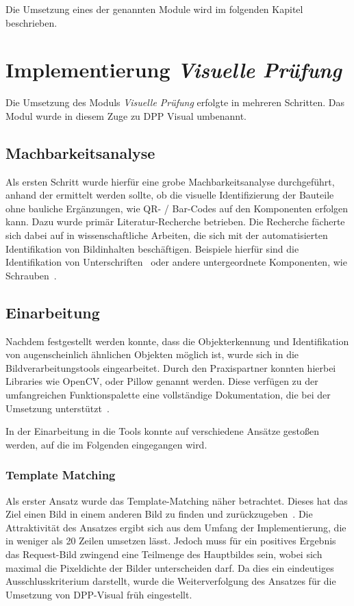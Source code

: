 \documentclass[
    type=Prakikumsbericht,
    status=draft, %
    language=german, %
    bibengine=bibtex,
]{unibwm-inf-thesis}
\begin{document}
    Die Umsetzung eines der genannten Module wird im folgenden Kapitel beschrieben.


    \chapter{Implementierung \textit{Visuelle Prüfung}}
    Die Umsetzung des Moduls \textit{Visuelle Prüfung} erfolgte in mehreren Schritten.
    Das Modul wurde in diesem Zuge zu \ac{DPP} Visual umbenannt.

    \section{Machbarkeitsanalyse}
    Als ersten Schritt wurde hierfür eine grobe Machbarkeitsanalyse durchgeführt, anhand der ermittelt werden sollte,
    ob die visuelle Identifizierung der Bauteile ohne bauliche Ergänzungen, wie QR- / Bar-Codes auf den Komponenten erfolgen kann.
    Dazu wurde primär Literatur-Recherche betrieben.
    Die Recherche fächerte sich dabei auf in wissenschaftliche Arbeiten, die sich mit der automatisierten Identifikation von Bildinhalten beschäftigen.
    Beispiele hierfür sind die Identifikation von Unterschriften~\citep{Munich2003} oder andere untergeordnete Komponenten, wie Schrauben~\citep{Lehr2019}.

    \section{Einarbeitung}
    Nachdem festgestellt werden konnte, dass die Objekterkennung und Identifikation von augenscheinlich ähnlichen Objekten möglich ist, wurde sich in die Bildverarbeitungstools eingearbeitet.
    Durch den Praxispartner konnten hierbei Libraries wie OpenCV, oder Pillow genannt werden.
    Diese verfügen zu der umfangreichen Funktionspalette eine vollständige Dokumentation, die bei der Umsetzung unterstützt~\citep{OpenCV2022}.

    In der Einarbeitung in die Tools konnte auf verschiedene Ansätze gestoßen werden, auf die im Folgenden eingegangen wird.

    \subsection{Template Matching}
    Als erster Ansatz wurde das Template-Matching näher betrachtet.
    Dieses hat das Ziel einen Bild in einem anderen Bild zu finden und zurückzugeben~\cite{CV2TemplateMatching2022}.
    Die Attraktivität des Ansatzes ergibt sich aus dem Umfang der Implementierung, die in weniger als 20 Zeilen umsetzen lässt.
    Jedoch muss für ein positives Ergebnis das Request-Bild zwingend eine Teilmenge des Hauptbildes sein, wobei sich maximal die Pixeldichte der Bilder unterscheiden darf.
    Da dies ein eindeutiges Ausschlusskriterium darstellt, wurde die Weiterverfolgung des Ansatzes für die Umsetzung von DPP-Visual früh eingestellt.
\end{document}
